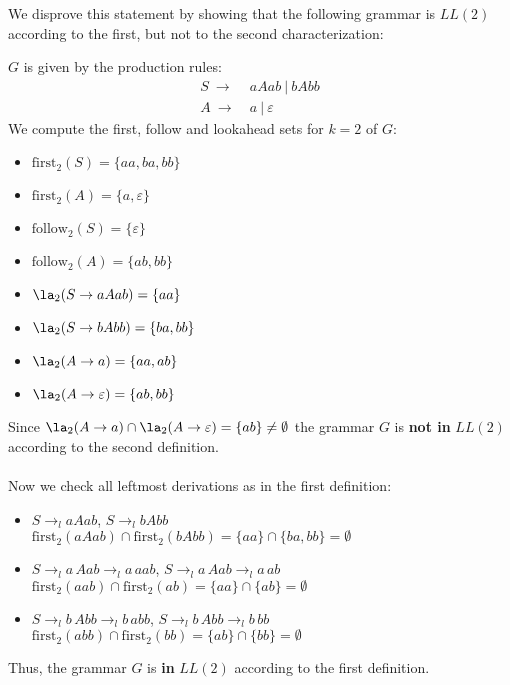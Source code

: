 \begin{solution}
We disprove this statement by showing that the following grammar is $LL(2)$ according to the first, but not to the second characterization:

$G$ is given by the production rules:
  \begin{align*}
    S ~\to~ & aAab ~|~ bAbb \\
    A ~\to~ & a ~|~ \varepsilon
  \end{align*}
We compute the first, follow and lookahead sets for $k=2$ of $G$:
\begin{itemize}
\item $\textrm{first}_2(S) = \{aa, ba, bb\}$
\item $\textrm{first}_2(A) = \{a, \varepsilon\}$
\item $\textrm{follow}_2(S) = \{\varepsilon\}$
\item $\textrm{follow}_2(A) = \{ab, bb\}$\\
\item $\la_2(S \to aAab) = \{aa\}$
\item $\la_2(S \to bAbb) = \{ba, bb\}$
\item $\la_2(A \to a) = \{aa, ab\}$
\item $\la_2(A \to \varepsilon) = \{ab, bb\}$
\end{itemize}
Since $\la_2(A \to a) \cap \la_2(A \to \varepsilon) = \{ab\} \neq \emptyset$ the grammar $G$ is \textbf{not in} $LL(2)$ according to the second definition.\\
\\
Now we check all leftmost derivations as in the first definition:
\begin{itemize}
\item $S \to_l aAab$, $S \to_l bAbb$\\
$\textrm{first}_2(aAab) \cap \textrm{first}_2(bAbb)
= \{aa\} \cap \{ba, bb\} = \emptyset$ \\

\item $S \to_l a\,Aab \to_l a\,aab$, $S \to_l a\,Aab \to_l a\,ab$\\
$\textrm{first}_2(aab) \cap \textrm{first}_2(ab)
= \{aa\} \cap \{ab\} = \emptyset$ \\

\item $S \to_l b\,Abb \to_l b\,abb$, $S \to_l b\,Abb \to_l b\,bb$\\
$\textrm{first}_2(abb) \cap \textrm{first}_2(bb)
= \{ab\} \cap \{bb\} = \emptyset$
\end{itemize}

Thus, the grammar $G$ is \textbf{in} $LL(2)$ according to the first definition. \\
\end{solution}

